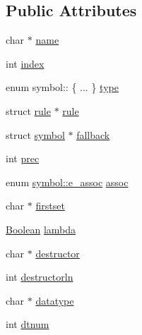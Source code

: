 \subsection*{Public Attributes}
\begin{DoxyCompactItemize}
\item 
char $\ast$ \hyperlink{structsymbol_a4fad8f11a2b2d8a21dcb4f5623d6c0fd}{name}
\item 
int \hyperlink{structsymbol_a1aa96687297a13a207e48b4d8f3ba78b}{index}
\item 
enum symbol\-:: \{ ... \}  \hyperlink{structsymbol_af7354af68ac51816c1823dd6172f9b54}{type}
\item 
struct \hyperlink{structrule}{rule} $\ast$ \hyperlink{structsymbol_a15c02dd88e3c480c918854efb5a803d6}{rule}
\item 
struct \hyperlink{structsymbol}{symbol} $\ast$ \hyperlink{structsymbol_a0a658f976944ccfbed28466b4eec903b}{fallback}
\item 
int \hyperlink{structsymbol_a4058876fd1fcbafa71c0e52c518551ee}{prec}
\item 
enum \hyperlink{structsymbol_a898f1247f875b32c8d38fcb533096ff7}{symbol\-::e\-\_\-assoc} \hyperlink{structsymbol_a127ca0c533713b891c419c179f7adbc1}{assoc}
\item 
char $\ast$ \hyperlink{structsymbol_a3a267e61976991b0371b307ac4110b26}{firstset}
\item 
\hyperlink{lemon_8c_ae7d38601dfbd73adbe5c1b3ec34e0e13}{Boolean} \hyperlink{structsymbol_af12ee4e73e9878f1e5243ad1d1d06987}{lambda}
\item 
char $\ast$ \hyperlink{structsymbol_ae2b28522ba863dcbf3669b507721f09a}{destructor}
\item 
int \hyperlink{structsymbol_a1bff7c9f99ddfaf424749f0d4d81de55}{destructorln}
\item 
char $\ast$ \hyperlink{structsymbol_a357d5f2896188ae50564294cc294580f}{datatype}
\item 
int \hyperlink{structsymbol_ae976c29bbbd980685a026b6e658c4dc3}{dtnum}
\end{DoxyCompactItemize}


